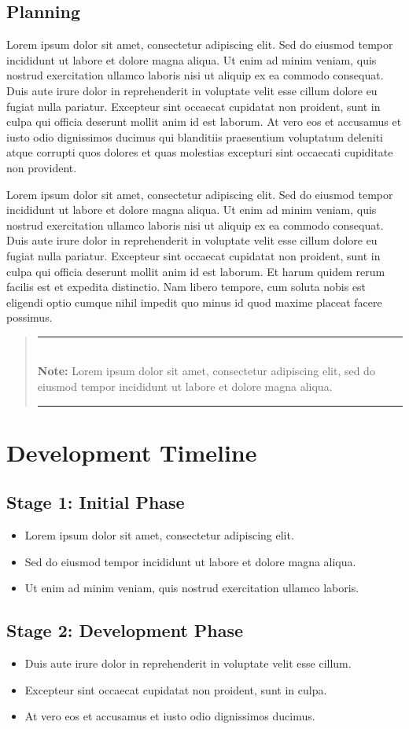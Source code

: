 \documentclass[11pt,a4paper]{article}
\newcommand{\loremtext}[1]{%
  Lorem ipsum dolor sit amet, consectetur adipiscing elit. Sed do eiusmod tempor incididunt ut labore et dolore magna aliqua. Ut enim ad minim veniam, quis nostrud exercitation ullamco laboris nisi ut aliquip ex ea commodo consequat. Duis aute irure dolor in reprehenderit in voluptate velit esse cillum dolore eu fugiat nulla pariatur. Excepteur sint occaecat cupidatat non proident, sunt in culpa qui officia deserunt mollit anim id est laborum.%
}
\newenvironment{keypoint}%
{\begin{quote}\textcolor{audiomageblue}{\rule{\textwidth}{1pt}}\vspace{0.2em}\\\textbf{Note:} }%
{\vspace{0.2em}\\\textcolor{audiomageblue}{\rule{\textwidth}{1pt}}\end{quote}}
\begin{document}
\subsection{Planning}

\loremtext{14} At vero eos et accusamus et iusto odio dignissimos ducimus qui blanditiis praesentium voluptatum deleniti atque corrupti quos dolores et quas molestias excepturi sint occaecati cupiditate non provident.

\loremtext{15} Et harum quidem rerum facilis est et expedita distinctio. Nam libero tempore, cum soluta nobis est eligendi optio cumque nihil impedit quo minus id quod maxime placeat facere possimus.

\begin{keypoint}
Lorem ipsum dolor sit amet, consectetur adipiscing elit, sed do eiusmod tempor incididunt ut labore et dolore magna aliqua.
\end{keypoint}

\section{Development Timeline}

\subsection{Stage 1: Initial Phase}

\begin{itemize}
  \item Lorem ipsum dolor sit amet, consectetur adipiscing elit.
  \item Sed do eiusmod tempor incididunt ut labore et dolore magna aliqua.
  \item Ut enim ad minim veniam, quis nostrud exercitation ullamco laboris.
\end{itemize}

\subsection{Stage 2: Development Phase}

\begin{itemize}
  \item Duis aute irure dolor in reprehenderit in voluptate velit esse cillum.
  \item Excepteur sint occaecat cupidatat non proident, sunt in culpa.
  \item At vero eos et accusamus et iusto odio dignissimos ducimus.
\end{itemize}
\end{document}
